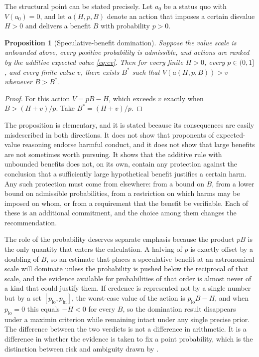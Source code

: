 \documentclass[11pt]{article}
\newtheorem{proposition}{Proposition}
\theoremstyle{definition}
\theoremstyle{remark}
\begin{document}
The structural point can be stated precisely. Let $a_0$ be a status quo with $V(a_0)=0$, and let $a(H,p,B)$ denote an action that imposes a certain disvalue $H>0$ and delivers a benefit $B$ with probability $p>0$.

\begin{proposition}[Speculative-benefit domination]
\label{prop:domination}
Suppose the value scale is unbounded above, every positive probability is admissible, and actions are ranked by the additive expected value \eqref{eq:ev}. Then for every finite $H>0$, every $p\in(0,1]$, and every finite value $v$, there exists $B^{*}$ such that $V(a(H,p,B))>v$ whenever $B>B^{*}$.
\end{proposition}

\begin{proof}
For this action $V=pB-H$, which exceeds $v$ exactly when $B>(H+v)/p$. Take $B^{*}=(H+v)/p$.
\end{proof}

The proposition is elementary, and it is stated because its consequences are easily misdescribed in both directions. It does not show that proponents of expected-value reasoning endorse harmful conduct, and it does not show that large benefits are not sometimes worth pursuing. It shows that the additive rule with unbounded benefits does not, on its own, contain any protection against the conclusion that a sufficiently large hypothetical benefit justifies a certain harm. Any such protection must come from elsewhere: from a bound on $B$, from a lower bound on admissible probabilities, from a restriction on which harms may be imposed on whom, or from a requirement that the benefit be verifiable. Each of these is an additional commitment, and the choice among them changes the recommendation.

The role of the probability deserves separate emphasis because the product $pB$ is the only quantity that enters the calculation. A halving of $p$ is exactly offset by a doubling of $B$, so an estimate that places a speculative benefit at an astronomical scale will dominate unless the probability is pushed below the reciprocal of that scale, and the evidence available for probabilities of that order is almost never of a kind that could justify them. If credence is represented not by a single number but by a set $[p_{\mathrm{lo}},p_{\mathrm{hi}}]$, the worst-case value of the action is $p_{\mathrm{lo}}B-H$, and when $p_{\mathrm{lo}}=0$ this equals $-H<0$ for every $B$, so the domination result disappears under a maximin criterion \citep{gilboa1989} while remaining intact under any single precise prior. The difference between the two verdicts is not a difference in arithmetic. It is a difference in whether the evidence is taken to fix a point probability, which is the distinction between risk and ambiguity drawn by \citet{ellsberg1961}.
\end{document}
